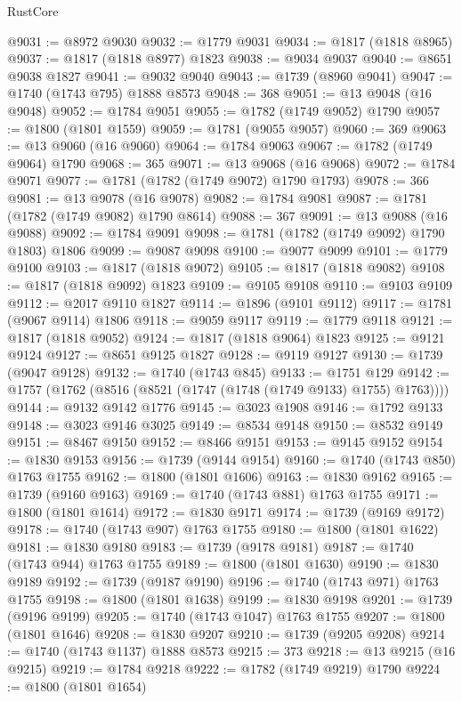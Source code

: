 \begin{lexlean}{RustCore}
\begin{coremodule}
@9031 := @8972 @9030
@9032 := @1779 @9031
@9034 := @1817 (@1818 @8965)
@9037 := @1817 (@1818 @8977) @1823
@9038 := @9034 @9037
@9040 := @8651 @9038 @1827
@9041 := @9032 @9040
@9043 := @1739 (@8960 @9041)
@9047 := @1740 (@1743 @795) @1888 @8573
@9048 := 368
@9051 := @13 @9048 (@16 @9048)
@9052 := @1784 @9051
@9055 := @1782 (@1749 @9052) @1790
@9057 := @1800 (@1801 @1559)
@9059 := @1781 (@9055 @9057)
@9060 := 369
@9063 := @13 @9060 (@16 @9060)
@9064 := @1784 @9063
@9067 := @1782 (@1749 @9064) @1790
@9068 := 365
@9071 := @13 @9068 (@16 @9068)
@9072 := @1784 @9071
@9077 := @1781 (@1782 (@1749 @9072) @1790 @1793)
@9078 := 366
@9081 := @13 @9078 (@16 @9078)
@9082 := @1784 @9081
@9087 := @1781 (@1782 (@1749 @9082) @1790 @8614)
@9088 := 367
@9091 := @13 @9088 (@16 @9088)
@9092 := @1784 @9091
@9098 := @1781 (@1782 (@1749 @9092) @1790 @1803) @1806
@9099 := @9087 @9098
@9100 := @9077 @9099
@9101 := @1779 @9100
@9103 := @1817 (@1818 @9072)
@9105 := @1817 (@1818 @9082)
@9108 := @1817 (@1818 @9092) @1823
@9109 := @9105 @9108
@9110 := @9103 @9109
@9112 := @2017 @9110 @1827
@9114 := @1896 (@9101 @9112)
@9117 := @1781 (@9067 @9114) @1806
@9118 := @9059 @9117
@9119 := @1779 @9118
@9121 := @1817 (@1818 @9052)
@9124 := @1817 (@1818 @9064) @1823
@9125 := @9121 @9124
@9127 := @8651 @9125 @1827
@9128 := @9119 @9127
@9130 := @1739 (@9047 @9128)
@9132 := @1740 (@1743 @845)
@9133 := @1751 @129
@9142 := @1757 (@1762 (@8516 (@8521 (@1747 (@1748 (@1749 @9133) @1755) @1763))))
@9144 := @9132 @9142 @1776
@9145 := @3023 @1908
@9146 := @1792 @9133
@9148 := @3023 @9146 @3025
@9149 := @8534 @9148
@9150 := @8532 @9149
@9151 := @8467 @9150
@9152 := @8466 @9151
@9153 := @9145 @9152
@9154 := @1830 @9153
@9156 := @1739 (@9144 @9154)
@9160 := @1740 (@1743 @850) @1763 @1755
@9162 := @1800 (@1801 @1606)
@9163 := @1830 @9162
@9165 := @1739 (@9160 @9163)
@9169 := @1740 (@1743 @881) @1763 @1755
@9171 := @1800 (@1801 @1614)
@9172 := @1830 @9171
@9174 := @1739 (@9169 @9172)
@9178 := @1740 (@1743 @907) @1763 @1755
@9180 := @1800 (@1801 @1622)
@9181 := @1830 @9180
@9183 := @1739 (@9178 @9181)
@9187 := @1740 (@1743 @944) @1763 @1755
@9189 := @1800 (@1801 @1630)
@9190 := @1830 @9189
@9192 := @1739 (@9187 @9190)
@9196 := @1740 (@1743 @971) @1763 @1755
@9198 := @1800 (@1801 @1638)
@9199 := @1830 @9198
@9201 := @1739 (@9196 @9199)
@9205 := @1740 (@1743 @1047) @1763 @1755
@9207 := @1800 (@1801 @1646)
@9208 := @1830 @9207
@9210 := @1739 (@9205 @9208)
@9214 := @1740 (@1743 @1137) @1888 @8573
@9215 := 373
@9218 := @13 @9215 (@16 @9215)
@9219 := @1784 @9218
@9222 := @1782 (@1749 @9219) @1790
@9224 := @1800 (@1801 @1654)

\end{coremodule}
\end{lexlean}
